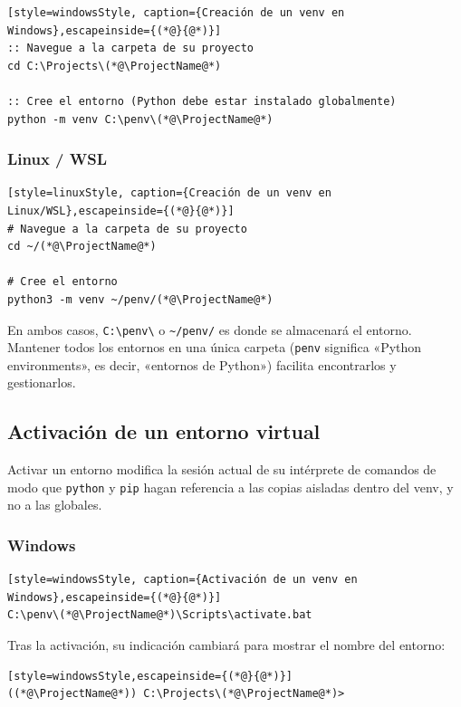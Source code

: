 \begin{lstlisting}[style=windowsStyle, caption={Creación de un venv en Windows},escapeinside={(*@}{@*)}]
:: Navegue a la carpeta de su proyecto
cd C:\Projects\(*@\ProjectName@*)

:: Cree el entorno (Python debe estar instalado globalmente)
python -m venv C:\penv\(*@\ProjectName@*)
\end{lstlisting}

\subsubsection{Linux / WSL}

\begin{lstlisting}[style=linuxStyle, caption={Creación de un venv en Linux/WSL},escapeinside={(*@}{@*)}]
# Navegue a la carpeta de su proyecto
cd ~/(*@\ProjectName@*)

# Cree el entorno
python3 -m venv ~/penv/(*@\ProjectName@*)
\end{lstlisting}

En ambos casos, \texttt{C:\textbackslash penv\textbackslash \ProjectName{}} o
\texttt{\textasciitilde/penv/\ProjectName{}} es donde se almacenará el entorno.
Mantener todos los entornos en una única carpeta (\texttt{penv} significa
«Python environments», es decir, «entornos de Python») facilita encontrarlos
y gestionarlos.

\subsection{Activación de un entorno virtual}

Activar un entorno modifica la sesión actual de su intérprete de comandos
de modo que \texttt{python} y \texttt{pip} hagan referencia a las copias
aisladas dentro del venv, y no a las globales.

\subsubsection{Windows}

\begin{lstlisting}[style=windowsStyle, caption={Activación de un venv en Windows},escapeinside={(*@}{@*)}]
C:\penv\(*@\ProjectName@*)\Scripts\activate.bat
\end{lstlisting}

Tras la activación, su indicación cambiará para mostrar el nombre del entorno:
\begin{lstlisting}[style=windowsStyle,escapeinside={(*@}{@*)}]
((*@\ProjectName@*)) C:\Projects\(*@\ProjectName@*)>
\end{lstlisting}

